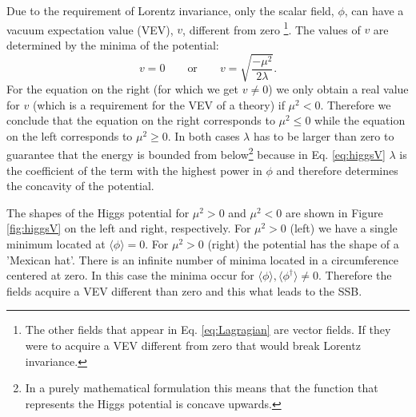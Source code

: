 Due to the requirement of Lorentz invariance, only the scalar field, $\phi$, can have a vacuum expectation value (VEV), $v$, different from zero \footnote{The other fields that appear in Eq. \ref{eq:Lagragian} are vector fields. If they were to acquire a VEV different from zero that would break Lorentz invariance.}. The values of $v$ are determined by the minima of the potential:
\begin{equation}
v=0 \qquad \text{or} \qquad v=\sqrt{\frac{-\mu^2}{2\lambda}}.
\end{equation}
For the equation on the right (for which we get $v\neq 0$) we only obtain a real value for $v$ (which is a requirement for the VEV of a theory) if $\mu^2<0$. Therefore we conclude that the equation on the right corresponds to $\mu^2\leq0$ while the equation on the left corresponds to $\mu^2\geq0$. In both cases $\lambda$ has to be larger than zero to guarantee that the energy is bounded from below\footnote{In a purely mathematical formulation this means that the function that represents the Higgs potential is concave upwards.} because in Eq. \ref{eq:higgsV} $\lambda$ is the coefficient of the term with the highest power in $\phi$ and therefore determines the concavity of the potential. 

The shapes of the Higgs potential for $\mu^2>0$ and $\mu^2<0$ are shown in Figure \ref{fig:higgsV} on the left and right, respectively. For $\mu^2>0$ (left) we have a single minimum located at $\langle\phi\rangle=0$. For $\mu^2>0$ (right) the potential has the shape of a 'Mexican hat'. There is an infinite number of minima located in a circumference centered at zero. In this case the minima occur for $\langle\phi\rangle,\langle\phi^{\dagger}\rangle\neq 0$. Therefore the fields acquire a VEV different than zero and this what leads to the SSB.




